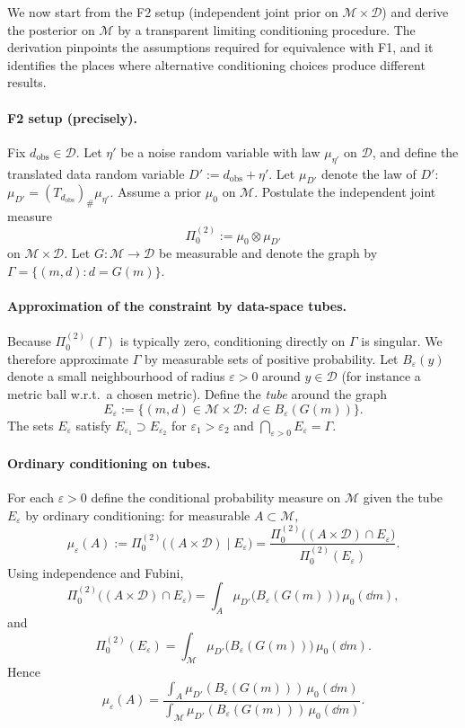 \documentclass[11pt]{article}
\theoremstyle{remark}
\newcommand{\modelspace}{\mathcal{M}}
\newcommand{\dataspace}{\mathcal{D}}
\begin{document}
We now start from the F2 setup (independent joint prior on \(\modelspace\times\dataspace\))
and derive the posterior on \(\modelspace\) by a transparent limiting conditioning
procedure. The derivation pinpoints the assumptions required for equivalence
with F1, and it identifies the places where alternative conditioning choices
produce different results.

\paragraph{F2 setup (precisely).}
Fix \(d_{\mathrm{obs}}\in\dataspace\). Let \(\eta'\) be a noise random variable
with law \(\mu_{\eta'}\) on \(\dataspace\), and define the translated data
random variable \(D' := d_{\mathrm{obs}} + \eta'\). Let \(\mu_{D'}\) denote
the law of \(D'\): \(\mu_{D'}=(T_{d_{\mathrm{obs}}})_\#\mu_{\eta'}\).
Assume a prior \(\mu_0\) on \(\modelspace\). Postulate the independent joint
measure
\[
\Pi_0^{(2)} := \mu_0 \otimes \mu_{D'}
\]
on \(\modelspace\times\dataspace\). Let \(G:\modelspace\to\dataspace\) be
measurable and denote the graph by \(\Gamma=\{(m,d):d=G(m)\}\).

\paragraph{Approximation of the constraint by data-space tubes.}
Because \(\Pi_0^{(2)}(\Gamma)\) is typically zero, conditioning directly on
\(\Gamma\) is singular. We therefore approximate \(\Gamma\) by measurable
sets of positive probability. Let \(B_\varepsilon(y)\) denote a small
neighbourhood of radius \(\varepsilon>0\) around \(y\in\dataspace\) (for
instance a metric ball w.r.t.\ a chosen metric). Define the \emph{tube}
around the graph
\[
E_\varepsilon := \{(m,d)\in\modelspace\times\dataspace:\ d\in B_\varepsilon(G(m))\}.
\]
The sets \(E_\varepsilon\) satisfy \(E_{\varepsilon_1}\supset E_{\varepsilon_2}\)
for \(\varepsilon_1>\varepsilon_2\) and \(\bigcap_{\varepsilon>0} E_\varepsilon=\Gamma\).

\paragraph{Ordinary conditioning on tubes.}
For each \(\varepsilon>0\) define the conditional probability measure on
\(\modelspace\) given the tube \(E_\varepsilon\) by ordinary conditioning:
for measurable \(A\subset\modelspace\),
\[
\mu_\varepsilon(A)
:= \Pi_0^{(2)}\bigl((A\times\dataspace)\mid E_\varepsilon\bigr)
= \frac{\Pi_0^{(2)}\bigl((A\times\dataspace)\cap E_\varepsilon\bigr)}
{\Pi_0^{(2)}(E_\varepsilon)}.
\]
Using independence and Fubini,
\[
\Pi_0^{(2)}\bigl((A\times\dataspace)\cap E_\varepsilon\bigr)
= \int_A \mu_{D'}\bigl(B_\varepsilon(G(m))\bigr)\,\mu_0(\dd m),
\]
and
\[
\Pi_0^{(2)}(E_\varepsilon)
= \int_{\modelspace} \mu_{D'}\bigl(B_\varepsilon(G(m))\bigr)\,\mu_0(\dd m).
\]
Hence
\begin{equation}\label{eq:epsilon-posterior}
\mu_\varepsilon(A)
=
\frac{\int_A \mu_{D'}(B_\varepsilon(G(m)))\,\mu_0(\dd m)}
{\int_{\modelspace} \mu_{D'}(B_\varepsilon(G(m)))\,\mu_0(\dd m)}.
\end{equation}
\end{document}
